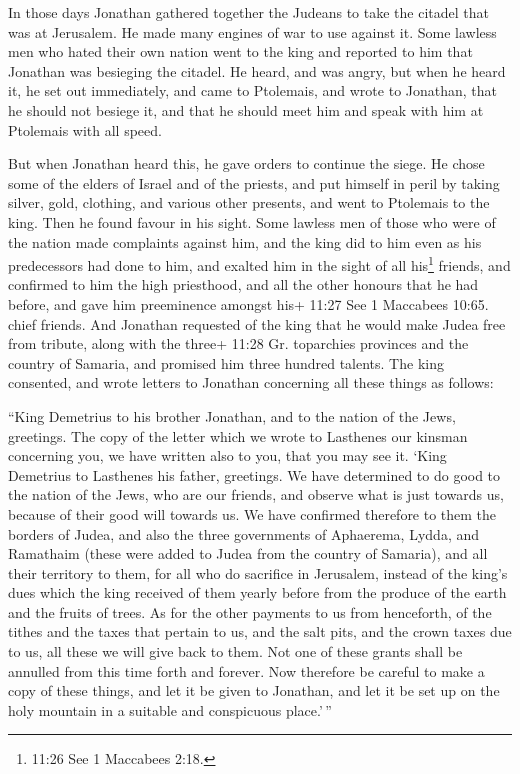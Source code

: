  In those days Jonathan gathered together the Judeans to
take the citadel that was at Jerusalem. He made many engines of war to
use against it.  Some lawless men who hated their own
nation went to the king and reported to him that Jonathan was besieging
the citadel.  He heard, and was angry, but when he heard
it, he set out immediately, and came to Ptolemais, and wrote to
Jonathan, that he should not besiege it, and that he should meet him and
speak with him at Ptolemais with all speed.

 But when Jonathan heard this, he gave orders to continue
the siege. He chose some of the elders of Israel and of the priests, and
put himself in peril  by taking silver, gold, clothing, and
various other presents, and went to Ptolemais to the king. Then he found
favour in his sight.  Some lawless men of those who were of
the nation made complaints against him,  and the king did
to him even as his predecessors had done to him, and exalted him in the
sight of all his\footnote{11:26 See 1 Maccabees 2:18.} friends,
 and confirmed to him the high priesthood, and all the
other honours that he had before, and gave him preeminence amongst his+
11:27 See 1 Maccabees 10:65. chief friends.  And Jonathan
requested of the king that he would make Judea free from tribute, along
with the three+ 11:28 Gr. toparchies provinces and the country of
Samaria, and promised him three hundred talents.  The king
consented, and wrote letters to Jonathan concerning all these things as
follows:

 ``King Demetrius to his brother Jonathan, and to the
nation of the Jews, greetings.  The copy of the letter
which we wrote to Lasthenes our kinsman concerning you, we have written
also to you, that you may see it.  `King Demetrius to
Lasthenes his father, greetings.  We have determined to do
good to the nation of the Jews, who are our friends, and observe what is
just towards us, because of their good will towards us.  We
have confirmed therefore to them the borders of Judea, and also the
three governments of Aphaerema, Lydda, and Ramathaim (these were added
to Judea from the country of Samaria), and all their territory to them,
for all who do sacrifice in Jerusalem, instead of the king's dues which
the king received of them yearly before from the produce of the earth
and the fruits of trees.  As for the other payments to us
from henceforth, of the tithes and the taxes that pertain to us, and the
salt pits, and the crown taxes due to us, all these we will give back to
them.  Not one of these grants shall be annulled from this
time forth and forever.  Now therefore be careful to make a
copy of these things, and let it be given to Jonathan, and let it be set
up on the holy mountain in a suitable and conspicuous place.'\,''

